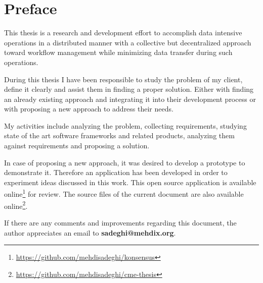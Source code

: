 \chapter*{Preface}
\label{cha:preface}
This thesis is a research and development effort to accomplish data intensive operations 
in a distributed manner with a collective but decentralized approach toward workflow management 
while minimizing data transfer during such operations.

During this thesis I have been responsible to study the problem of my client,
define it clearly and assist them in finding a proper solution.
Either with finding an already existing approach 
and integrating it into their development process 
or with proposing a new approach to address their needs. 

My activities include analyzing the problem, collecting requirements,
studying state of the art software frameworks and related products,
analyzing them against requirements and
proposing a solution.

In case of proposing a new approach,
it was desired to develop a prototype to demonstrate it.
Therefore an application has been developed in order to experiment ideas discussed in this work. 
This open source application is available online\footnote{\url{https://github.com/mehdisadeghi/konsensus}}
for review.
The source files of the current document are also available online\footnote{\url{https://github.com/mehdisadeghi/cme-thesis}}.

If there are any comments and improvements regarding this document, the author
appreciates an email to \textbf{sadeghi@mehdix.org}.